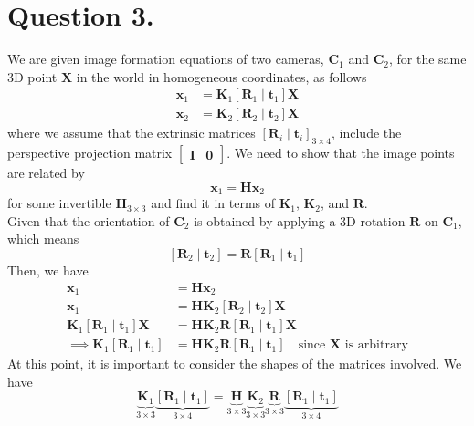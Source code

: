 \documentclass[10pt]{article}
\newcommand{\orientation}[1]{\left[ \mathbf{R}_{#1} \mid \mathbf{t}_{#1} \right]}
\begin{document}
    \section*{\textbf{Question 3.}}
    We are given image formation equations of two cameras, $\mathbf{C}_{1}$ and
    $\mathbf{C}_{2}$, for the same 3D point $\mathbf{X}$ in the world in homogeneous
    coordinates, as follows
    \begin{align*}
        \mathbf{x}_{1} &= \mathbf{K}_{1} \orientation{1} \mathbf{X} \\
        \mathbf{x}_{2} &= \mathbf{K}_{2} \orientation{2} \mathbf{X}
    \end{align*}
    where we assume that the extrinsic matrices
    $\left[ \mathbf{R}_{i} \mid \mathbf{t}_{i} \right]_{3 \times 4}$, include the perspective projection
    matrix $\begin{bmatrix} \mathbf{I} & \mathbf{0} \end{bmatrix}$. We need to show that the image
    points are related by
    \begin{equation*}
        \mathbf{x}_{1} = \mathbf{H} \mathbf{x}_{2}
    \end{equation*}
    for some invertible $\mathbf{H}_{3 \times 3}$ and find it in terms of $\mathbf{K}_{1}$,
    $\mathbf{K}_{2}$, and $\mathbf{R}$. \\
    Given that the orientation of $\mathbf{C}_{2}$ is obtained by applying a 3D rotation
    $\mathbf{R}$ on $\mathbf{C}_{1}$, which means
    \begin{equation*}
        \orientation{2} = \mathbf{R} \orientation{1}
   \end{equation*}
    Then, we have
    \begin{align*}
            \mathbf{x}_{1} &= \mathbf{H} \mathbf{x}_{2} \\
            \mathbf{x}_{1} &= \mathbf{H} \mathbf{K}_{2} \orientation{2} \mathbf{X} \\
            \mathbf{K}_{1} \orientation{1} \mathbf{X} &= \mathbf{H} \mathbf{K}_{2} \mathbf{R}
            \orientation{1} \mathbf{X} \\
            \implies \mathbf{K}_{1} \orientation{1} &= \mathbf{H} \mathbf{K}_{2} \mathbf{R} \orientation{1}
            \quad \text{since } \mathbf{X} \text{ is arbitrary}
    \end{align*}
    At this point, it is important to consider the shapes of the matrices involved. We have
    \begin{equation*}
        \underbrace{\mathbf{K}_{1}}_{3 \times 3} \underbrace{\orientation{1}}_{3 \times 4} =
        \underbrace{\mathbf{H}}_{3 \times 3} \underbrace{\mathbf{K}_{2}}_{3 \times 3}
        \underbrace{\mathbf{R}}_{3 \times 3} \underbrace{\orientation{1}}_{3 \times 4}
    \end{equation*}
\end{document}
